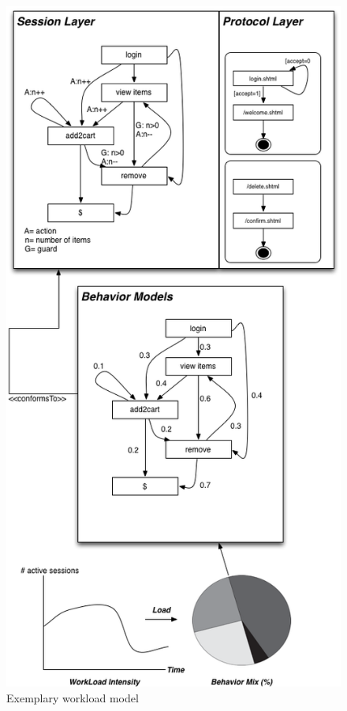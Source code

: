 \documentclass{report}
\begin{document}
\begin{figure}[!ht]
\begin{minipage}{.5\textwidth}
\centering
\includegraphics[width=1\textwidth]{./images/vogel.png}
\caption{Exemplary workload model}
\label{fig:vogel}


\end{minipage}
\end{figure}
\end{document}
